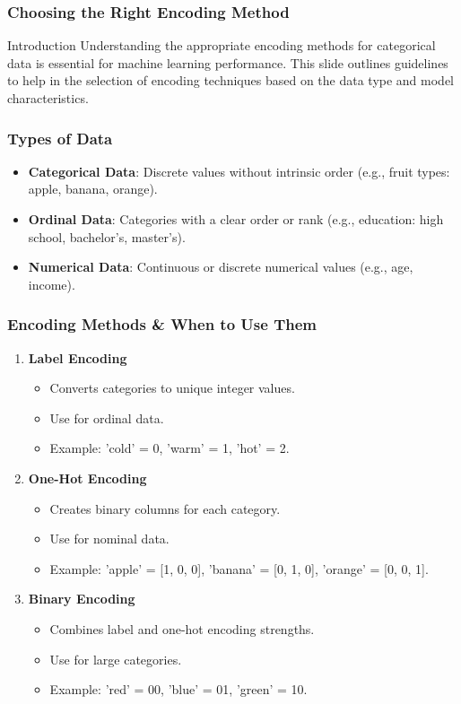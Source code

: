 \documentclass[aspectratio=169]{beamer}
\begin{document}
\begin{frame}[fragile]
    \frametitle{Choosing the Right Encoding Method}
    \begin{block}{Introduction}
        Understanding the appropriate encoding methods for categorical data is essential for machine learning performance. This slide outlines guidelines to help in the selection of encoding techniques based on the data type and model characteristics.
    \end{block}
\end{frame}

\begin{frame}[fragile]
    \frametitle{Types of Data}
    \begin{itemize}
        \item \textbf{Categorical Data}: Discrete values without intrinsic order (e.g., fruit types: apple, banana, orange).
        \item \textbf{Ordinal Data}: Categories with a clear order or rank (e.g., education: high school, bachelor’s, master’s).
        \item \textbf{Numerical Data}: Continuous or discrete numerical values (e.g., age, income).
    \end{itemize}
\end{frame}

\begin{frame}[fragile]
    \frametitle{Encoding Methods \& When to Use Them}
    \begin{enumerate}
        \item \textbf{Label Encoding}
            \begin{itemize}
                \item Converts categories to unique integer values.
                \item Use for ordinal data. 
                \item Example: 'cold' = 0, 'warm' = 1, 'hot' = 2.
            \end{itemize}
        
        \item \textbf{One-Hot Encoding}
            \begin{itemize}
                \item Creates binary columns for each category.
                \item Use for nominal data.
                \item Example: 'apple' = [1, 0, 0], 'banana' = [0, 1, 0], 'orange' = [0, 0, 1].
            \end{itemize}

        \item \textbf{Binary Encoding}
            \begin{itemize}
                \item Combines label and one-hot encoding strengths.
                \item Use for large categories.
                \item Example: 'red' = 00, 'blue' = 01, 'green' = 10.
            \end{itemize}
    \end{enumerate}
\end{frame}
\end{document}
